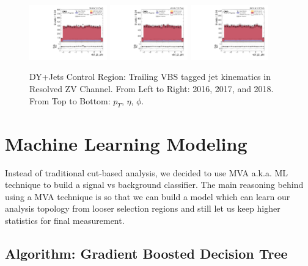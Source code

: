 \begin{figure}[!ht]
  \includegraphics[width=0.30\textwidth]{analysis_plots/2016_zjj/cr_vjets_l/vbf_j2_phi.pdf}
  \includegraphics[width=0.30\textwidth]{analysis_plots/2017_zjj/cr_vjets_l/vbf_j2_phi.pdf}
  \includegraphics[width=0.30\textwidth]{analysis_plots/2018_zjj/cr_vjets_l/vbf_j2_phi.pdf} \\
  \caption[DY+Jets Control Region: Trailing VBS tagged jet kinematics in Resolved ZV Channel]%
  {DY+Jets Control Region: Trailing VBS tagged jet kinematics in Resolved ZV Channel. From Left to Right: 2016,
    2017, and 2018. From Top to Bottom: \( p_T \), \( \eta \), \( \phi \).}%
  \label{fig:zjj-cr-vjets-l-vbs2-pt-eta-m}
\end{figure}

\clearpage
\section{
  Machine Learning Modeling
 }

Instead of traditional cut-based analysis, we decided to use \gls{MVA} a.k.a. \gls{ML}
technique to build a signal vs background classifier. The main reasoning behind using
a \gls{MVA} technique is so that we can build a model which can learn our
analysis topology from looser selection regions and still let us keep higher statistics
for final measurement.

\subsection{
  Algorithm: Gradient Boosted Decision Tree
}

